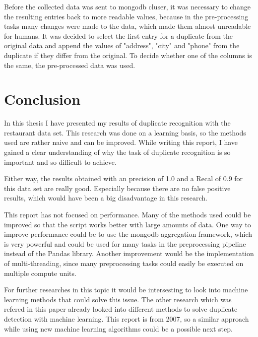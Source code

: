 \documentclass[conference]{IEEEtran}
\begin{document}
Before the collected data was sent to mongodb cluser, it was necessary to change the resulting entries back to more readable values, because in the pre-processing tasks many changes were made to the data, which made them almost unreadable for humans. It was decided to select the first entry for a duplicate from the original data and append the values of "address", "city" and "phone" from the duplicate if they differ from the original. To decide whether one of the columns is the same, the pre-processed data was used.

\section{Conclusion}
In this thesis I have presented my results of duplicate recognition with the restaurant data set. This research was done on a learning basis, so the methods used are rather naive and can be improved. While writing this report, I have gained a clear understanding of why the task of duplicate recognition is so important and so difficult to achieve.

Either way, the results obtained with an precision of 1.0 and a Recal of 0.9 for this data set are really good. Especially because there are no false positive results, which would have been a big disadvantage in this research.

This report has not focused on performance. Many of the methods used could be improved so that the script works better with large amounts of data. One way to improve performance could be to use the mongodb aggregation framework, which is very powerful and could be used for many tasks in the preprocessing pipeline instead of the Pandas library. Another improvement would be the implementation of multi-threading, since many preprocessing tasks could easily be executed on multiple compute units.

For further researches in this topic it would be intersesting to look into machine learning methods that could solve this issue. The other research which was refered in this paper\cite{bib:foreign_research} already looked into different methods to solve duplicate detection with machine learning. This report is from 2007, so a similar approach while using new machine learning algorithms could be a possible next step.
\end{document}
